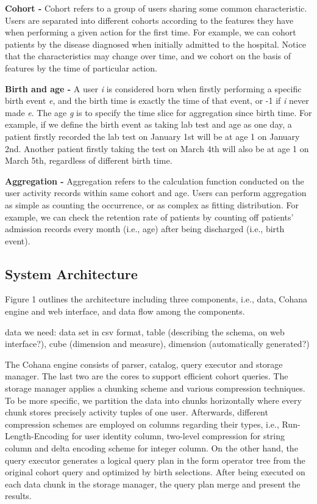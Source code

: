 \documentclass[10pt,conference,letterpaper]{IEEEtran}
\begin{document}
\textbf{Cohort -} Cohort refers to a group of users sharing some common characteristic. Users are separated into different cohorts according to the features they have when performing a given action for the first time. For example, we can cohort patients by the disease diagnosed when initially admitted to the hospital. Notice that the characteristics may change over time, and we cohort on the basis of features by the time of particular action.

\textbf{Birth and age -} A user \emph{i} is considered born when firstly performing a specific birth event \emph{e}, and the birth time is exactly the time of that event, or -1 if \emph{i} never made \emph{e}. The age \emph{g} is to specify the time slice for aggregation since birth time. For example, if we define the birth event as taking lab test and age as one day, a patient firstly recorded the lab test on January 1st will be at age 1 on January 2nd. Another patient firstly taking the test on March 4th will also be at age 1 on March 5th, regardless of different birth time.

\textbf{Aggregation -} Aggregation refers to the calculation function conducted on the user activity records within same cohort and age. Users can perform aggregation as simple as counting the occurrence, or as complex as fitting distribution. For example, we can check the retention rate of patients by counting off patients' admission records every month (i.e., age) after being discharged (i.e., birth event).

\subsection{System Architecture}

Figure 1 outlines the architecture including three components, i.e., data, Cohana engine and web interface, and data flow among the components.

data we need: data set in csv format, table (describing the schema, on web interface?), cube (dimension and measure), dimension (automatically generated?) 

The Cohana engine consists of parser, catalog, query executor and storage manager. The last two are the cores to support efficient cohort queries. The storage manager applies a chunking scheme and various compression techniques. To be more specific, we partition the data into chunks horizontally where every chunk stores precisely activity tuples of one user. Afterwards, different compression schemes are employed on columns regarding their types, i.e., Run-Length-Encoding for user identity column, two-level compression for string column and delta encoding scheme for integer column. On the other hand, the query executor generates a logical query plan in the form operator tree from the original cohort query and optimized by birth selections. After being executed on each data chunk in the storage manager, the query plan merge and present the results.
\end{document}
